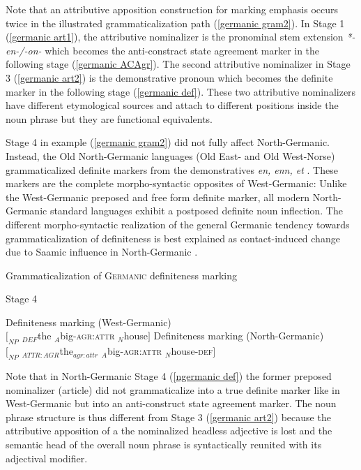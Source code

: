 {%
Note that an attributive apposition construction for marking emphasis occurs twice in the illustrated grammaticalization path (\ref{germanic gram2}). In Stage 1 (\ref{germanic art1}), the attributive nominalizer is the pronominal stem extension \textit{*-en-/-on-} which becomes the anti-constract state agreement marker in the following stage (\ref{germanic ACAgr}). The second attributive nominalizer in Stage 3 (\ref{germanic art2}) is the demonstrative pronoun which becomes the definite marker in the following stage (\ref{germanic def}). These two attributive nominalizers have different etymological sources and attach to different positions inside the noun phrase but they are functional equivalents.

Stage 4 in example (\ref{germanic gram2}) did not fully affect North-Germanic. Instead, the Old North-Germanic languages (Old East- and Old West-Norse) grammaticalized definite markers from the demonstratives \textit{en, enn, et} \citep[15]{heinrichs1954}. These markers are the complete morpho-syntactic opposites of West-Germanic: Unlike the West-Germanic preposed and free form definite marker, all modern North-Germanic standard languages exhibit a postposed definite noun inflection. The different morpho-syntactic realization of the general Germanic tendency towards grammaticalization of definiteness is best explained as contact-induced change due to Saamic influence in North-Germanic \citep{kusmenko2008}.
\begin{exe}
\ex Grammaticalization of \textsc{Germanic} definiteness marking \label{germanic gram3}
\begin{xlist}
\ex 	Stage 4
\begin{xlist}
\ex	Definiteness marking (West-Germanic)\\
$[_{NP}$ $_{DEF}$the $_{A}$big-\textsc{agr:attr} $_{N}$house$]$
\ex	Definiteness marking (North-Germanic)\\
$[_{NP}$ $_{ATTR:AGR}$the$_{agr:attr}$ $_{A}$big-\textsc{agr:attr} $_{N}$house-\textsc{def}$]$\label{ngermanic def}
\end{xlist}
\end{xlist}
\end{exe}
Note that in North-Germanic Stage 4 (\ref{ngermanic def}) the former preposed nominalizer (article) did not grammaticalize into a true definite marker like in West-Germanic but into an anti-construct state agreement marker. The noun phrase structure is thus different from Stage 3 (\ref{germanic art2}) because the attributive apposition of a the nominalized headless adjective is lost and the semantic head of the overall noun phrase is syntactically reunited with its adjectival modifier.

}
